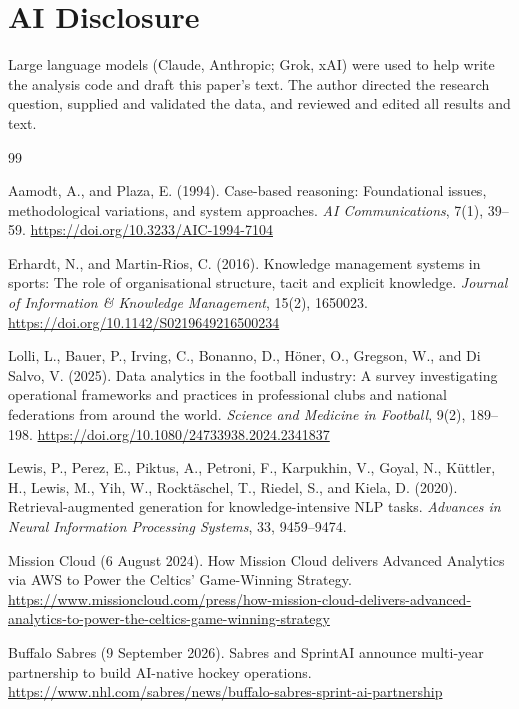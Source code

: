 \documentclass[11pt]{article}
\begin{document}
\section*{AI Disclosure}

Large language models (Claude, Anthropic; Grok, xAI) were used to help write the analysis code and draft this paper's text. The author directed the research question, supplied and validated the data, and reviewed and edited all results and text.

\begin{thebibliography}{99}

Aamodt, A., and Plaza, E. (1994).
Case-based reasoning: Foundational issues, methodological variations, and system approaches.
\textit{AI Communications}, 7(1), 39--59.
\url{https://doi.org/10.3233/AIC-1994-7104}

Erhardt, N., and Martin-Rios, C. (2016).
Knowledge management systems in sports: The role of organisational structure, tacit and explicit knowledge.
\textit{Journal of Information \& Knowledge Management}, 15(2), 1650023.
\url{https://doi.org/10.1142/S0219649216500234}

Lolli, L., Bauer, P., Irving, C., Bonanno, D., H\"oner, O., Gregson, W., and Di Salvo, V. (2025).
Data analytics in the football industry: A survey investigating operational frameworks and practices in professional clubs and national federations from around the world.
\textit{Science and Medicine in Football}, 9(2), 189--198.
\url{https://doi.org/10.1080/24733938.2024.2341837}

Lewis, P., Perez, E., Piktus, A., Petroni, F., Karpukhin, V., Goyal, N., K\"uttler, H., Lewis, M., Yih, W., Rockt\"aschel, T., Riedel, S., and Kiela, D. (2020).
Retrieval-augmented generation for knowledge-intensive NLP tasks.
\textit{Advances in Neural Information Processing Systems}, 33, 9459--9474.

Mission Cloud (6 August 2024).
How Mission Cloud delivers Advanced Analytics via AWS to Power the Celtics' Game-Winning Strategy.
\url{https://www.missioncloud.com/press/how-mission-cloud-delivers-advanced-analytics-to-power-the-celtics-game-winning-strategy}

Buffalo Sabres (9 September 2026).
Sabres and SprintAI announce multi-year partnership to build AI-native hockey operations.
\url{https://www.nhl.com/sabres/news/buffalo-sabres-sprint-ai-partnership}


\end{thebibliography}
\end{document}
